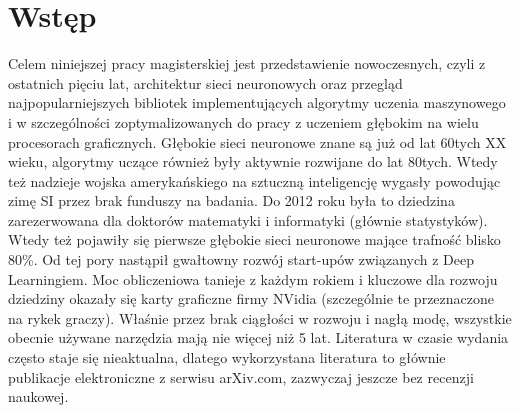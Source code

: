 \documentclass[12pt,a4paper,twoside,titlepage,openright]{book}
\begin{document}
\chapter*{Wstęp}
Celem niniejszej pracy magisterskiej jest przedstawienie nowoczesnych, czyli z ostatnich pięciu lat, architektur sieci neuronowych oraz przegląd najpopularniejszych bibliotek implementujących algorytmy uczenia maszynowego i w szczególności zoptymalizowanych do pracy z uczeniem głębokim na wielu procesorach graficznych. Głębokie sieci neuronowe znane są już od lat 60tych XX wieku, algorytmy uczące również były aktywnie rozwijane do lat 80tych. Wtedy też nadzieje wojska amerykańskiego na sztuczną inteligencję wygasły powodując zimę SI przez brak funduszy na badania. Do 2012 roku była to dziedzina zarezerwowana dla doktorów matematyki i informatyki (głównie statystyków). Wtedy też pojawiły się pierwsze głębokie sieci neuronowe mające trafność blisko 80\%. Od tej pory nastąpił gwałtowny rozwój start-upów związanych z Deep Learningiem. Moc obliczeniowa tanieje z każdym rokiem i kluczowe dla rozwoju dziedziny okazały się karty graficzne firmy NVidia (szczególnie te przeznaczone na rykek graczy). Właśnie przez brak ciągłości w rozwoju i nagłą modę, wszystkie obecnie używane narzędzia mają nie więcej niż 5 lat. Literatura w czasie wydania często staje się nieaktualna, dlatego wykorzystana literatura to głównie publikacje elektroniczne z serwisu arXiv.com, zazwyczaj jeszcze bez recenzji naukowej. 
\end{document}
